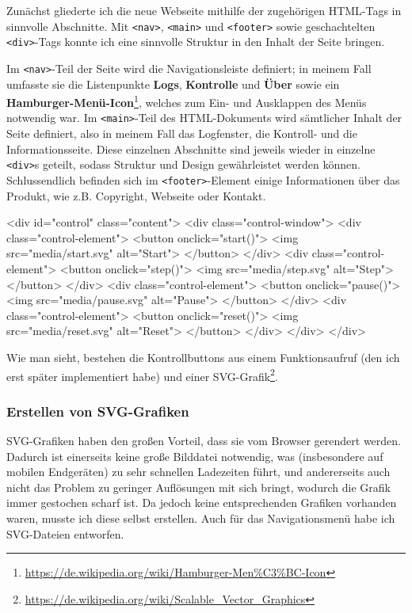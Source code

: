 Zunächst gliederte ich die neue Webseite mithilfe der zugehörigen HTML-Tags in sinnvolle
Abschnitte. Mit \texttt{<nav>}, \texttt{<main>} und \texttt{<footer>} sowie geschachtelten
\texttt{<div>}-Tags konnte ich eine sinnvolle Struktur in den Inhalt der Seite bringen.

Im \texttt{<nav>}-Teil der Seite wird die Navigationsleiste definiert; in meinem
Fall umfasste sie die Listenpunkte \textbf{Logs}, \textbf{Kontrolle} und \textbf{Über}
sowie ein \textbf{Hamburger-Menü-Icon}\footnote{\url{https://de.wikipedia.org/wiki/Hamburger-Men\%C3\%BC-Icon}},
welches zum Ein- und Ausklappen des Menüs notwendig war. Im \texttt{<main>}-Teil
des HTML-Dokuments wird sämtlicher Inhalt der Seite definiert, also in meinem Fall
das Logfenster, die Kontroll- und die Informationsseite. Diese einzelnen Abschnitte
sind jeweils wieder in einzelne \texttt{<div>}s geteilt, sodass Struktur und Design
gewährleistet werden können. Schlussendlich befinden sich im \texttt{<footer>}-Element
einige Informationen über das Produkt, wie z.B. Copyright, Webseite oder Kontakt.

\begin{code}[language=html, caption={Struktur der Kontrollseite}]
<div id="control" class="content">
	<div class="control-window">
		<div class="control-element">
			<button onclick="start()">
				<img src="media/start.svg" alt="Start">
			</button>
		</div>
		<div class="control-element">
			<button onclick="step()">
				<img src="media/step.svg" alt="Step">
			</button>
		</div>
		<div class="control-element">
			<button onclick="pause()">
				<img src="media/pause.svg" alt="Pause">
			</button>
		</div>
		<div class="control-element">
			<button onclick="reset()">
				<img src="media/reset.svg" alt="Reset">
			</button>
		</div>
	</div>
</div>
\end{code}

Wie man sieht, bestehen die Kontrollbuttons aus einem Funktionsaufruf (den ich erst
später implementiert habe) und einer SVG-Grafik\footnote{\url{https://de.wikipedia.org/wiki/Scalable\_Vector\_Graphics}}.

\subsubsection{Erstellen von SVG-Grafiken}
\label{subsubsec:webtools-remote-design-svg}

SVG-Grafiken haben den großen Vorteil, dass sie vom Browser gerendert werden. Dadurch
ist einerseits keine große Bilddatei notwendig, was (insbesondere auf mobilen Endgeräten)
zu sehr schnellen Ladezeiten führt, und andererseits auch nicht das Problem zu geringer
Auflösungen mit sich bringt, wodurch die Grafik immer gestochen scharf ist. Da jedoch
keine entsprechenden Grafiken vorhanden waren, musste ich diese selbst erstellen.
Auch für das Navigationsmenü habe ich SVG-Dateien entworfen.

